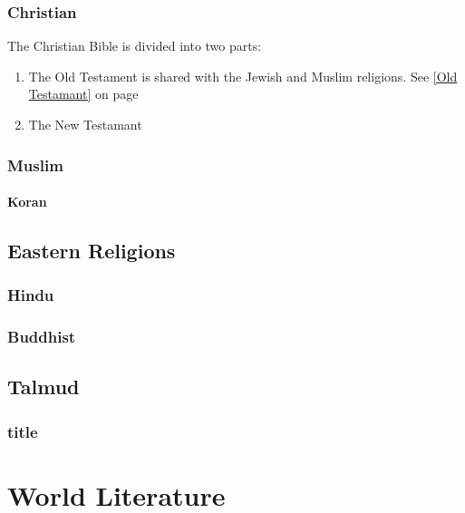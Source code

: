 			\subsubsection{Christian}
			The Christian Bible is divided into two parts:
			\begin{enumerate}
				\item The Old Testament is shared with the Jewish and Muslim religions. See \ref{Old Testamant} on page \pageref{Old Testamant}
				
				\item The New Testamant
			\end{enumerate}

					

			\subsubsection{Muslim}
				\paragraph{Koran}
				
		\subsection{Eastern Religions}
			\subsubsection{Hindu}
			\subsubsection{Buddhist}

		
		
		\subsection{Talmud}
		\subsubsection{title}
	\section{World Literature}